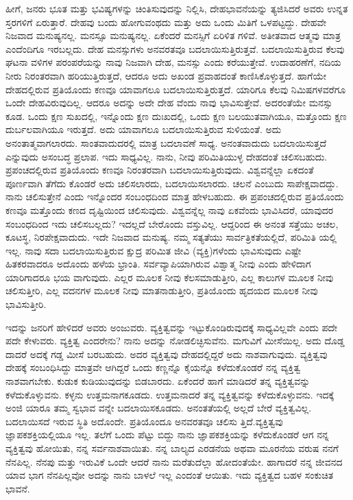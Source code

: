 ಹೀಗೆ, ಜನರು ಭೂತ ಮತ್ತು ಭವಿಷ್ಯಗಳನ್ನು ಚಿಂತಿಸುವುದನ್ನು ನಿಲ್ಲಿಸಿ, ದೇಹಭಾವನೆಯನ್ನು ತ್ಯಜಿಸಿದರೆ ಅವರು ಉನ್ನತ ಸ್ತರಗಳಿಗೆ ಏರುತ್ತಾರೆ. ದೇಹವು ಬಂದು ಹೋಗುವಂಥದು ಮತ್ತು ಅದು ಒಂದು ಮಿತಿಗೆ ಒಳಪಟ್ಟದ್ದು. ದೇಹವೇ ನಿಜವಾದ ಮನುಷ್ಯನಲ್ಲ. ಮನಸ್ಸೂ ಮನುಷ್ಯನಲ್ಲ. ಏಕೆಂದರೆ ಮನಸ್ಸಿಗೆ ಏರಿಳಿತ ಗಳಿವೆ. ಅತೀತವಾದ ಆತ್ಮವು ಮಾತ್ರ ಎಂದೆಂದಿಗೂ ಇರಬಲ್ಲದು. ದೇಹ ಮನಸ್ಸುಗಳು ಅನವರತವೂ ಬದಲಾಯಿಸುತ್ತಿರುತ್ತವೆ. ಬದಲಾಯಿಸುತ್ತಿರುವ ಕೆಲವು ಘಟನಾ ವಳಿಗಳ ಪರಂಪರೆಯನ್ನು ನಾವು ನಿಜವಾಗಿ ದೇಹ, ಮನಸ್ಸು ಎಂದು ಕರೆಯುತ್ತೇವೆ. ಉದಾಹರಣೆಗೆ, ನದಿಯ ನೀರು ನಿರಂತರವಾಗಿ ಹರಿಯುತ್ತಿರುತ್ತದೆ, ಆದರೂ ಅದು ಅಖಂಡ ಪ್ರವಾಹದಂತೆ ಕಾಣಿಸಿಕೊಳ್ಳುತ್ತದೆ. ಹಾಗೆಯೇ ದೇಹದಲ್ಲಿರುವ ಪ್ರತಿಯೊಂದು ಕಣವೂ ಯಾವಾಗಲೂ ಬದಲಾಯಿಸುತ್ತಿರುತ್ತದೆ. ಯಾರಿಗೂ ಕೆಲವು ನಿಮಿಷಗಳವರೆಗೂ ಒಂದೇ ದೇಹವಿರುವುದಿಲ್ಲ. ಆದರೂ ಅದನ್ನು ಅದೇ ದೇಹ ವೆಂದು ನಾವು ಭಾವಿಸುತ್ತೇವೆ. ಅದರಂತೆಯೇ ಮನಸ್ಸು ಕೂಡ. ಒಂದು ಕ್ಷಣ ಸುಖದಲ್ಲಿ, ಇನ್ನೊಂದು ಕ್ಷಣ ದುಃಖದಲ್ಲಿ, ಒಂದು ಕ್ಷಣ ಬಲಯುತವಾಗಿಯೂ, ಮತ್ತೊಂದು ಕ್ಷಣ ದುರ್ಬಲವಾಗಿಯೂ ಇರುತ್ತದೆ. ಅದು ಯಾವಾಗಲೂ ಬದಲಾಯಿಸುತ್ತಿರುವ ಸುಳಿಯಂತೆ. ಅದು ಅನಂತಾತ್ಮವಾಗಲಾರದು. ಸಾಂತವಾದುದರಲ್ಲಿ ಮಾತ್ರ ಬದಲಾವಣೆ ಸಾಧ್ಯ. ಅನಂತವಾದುದು ಬದಲಾಯಿಸುತ್ತದೆ ಎನ್ನುವುದು ಅಸಂಬದ್ಧ ಪ್ರಲಾಪ. ಇದು ಸಾಧ್ಯವಿಲ್ಲ. ನಾನು, ನೀವು ಪರಿಮಿತಿಯುಳ್ಳ ದೇಹದಂತೆ ಚಲಿಸಬಹುದು. ಪ್ರಪಂಚದಲ್ಲಿರುವ ಪ್ರತಿಯೊಂದು ಕಣವೂ ನಿರಂತರವಾಗಿ ಬದಲಾಯಿಸುತ್ತಿರುವುದು. ವಿಶ್ವವನ್ನೆಲ್ಲಾ ಏಕದಂತೆ ಪೂರ್ಣವಾಗಿ ತೆಗೆದು ಕೊಂಡರೆ ಅದು ಚಲಿಸಲಾರದು, ಬದಲಾಯಿಸಲಾರದು. ಚಲನೆ ಎಂಬುದು ಸಾಪೇಕ್ಷವಾದದ್ದು. ನಾನು ಚಲಿಸುತ್ತೇನೆ ಎಂದು ಇನ್ನೊಂದರ ಸಂಬಂಧದಿಂದ ಮಾತ್ರ ಹೇಳಬಹುದು. ಈ ಪ್ರಪಂಚದಲ್ಲಿರುವ ಪ್ರತಿಯೊಂದು ಕಣವೂ ಮತ್ತೊಂದು ಕಣದ ದೃಷ್ಟಿಯಿಂದ ಚಲಿಸುವುದು. ವಿಶ್ವವನ್ನೆಲ್ಲ ನಾವು ಏಕವೆಂದು ಭಾವಿಸಿದರೆ, ಯಾವುದರ ಸಂಬಂಧದಿಂದ ಇದು ಚಲಿಸಬಲ್ಲದು? ಇದಲ್ಲದೆ ಬೇರೊಂದು ವಸ್ತುವಿಲ್ಲ. ಆದ್ದರಿಂದ ಈ ಅನಂತ ಸತ್ತೆಯು ಅಚಲ, ಕೂಟಸ್ಥ, ನಿರಪೇಕ್ಷವಾದುದು. ಇದೇ ನಿಜವಾದ ಮನುಷ್ಯ. ನಮ್ಮ ಸತ್ಯತೆಯು ಸಾರ್ವತ್ರಿಕತೆಯಲ್ಲಿದೆ, ಪರಿಮಿತಿ ಯಲ್ಲಿ ಇಲ್ಲ. ನಾವು ಸದಾ ಬದಲಾಯಿಸುತ್ತಿರುವ ಕ್ಷುದ್ರ ಪರಿಮಿತ ಜೀವಿ (ವ್ಯಕ್ತಿ)ಗಳೆಂದು ಭಾವಿಸುವುದು ಎಷ್ಟೇ ಹಿತಕರವಾದರೂ ಅದೊಂದು ಹಳೆಯ ಭ್ರಾಂತಿ. ಸರ್ವವ್ಯಾಪಿಯಾಗಿರುವ ವಿಶ್ವಾತ್ಮ ನೀವು ಎಂದು ಹೇಳಿದಾಗ ಯಾರಿಗಾದರೂ ಭಯ ವಾಗುವುದು. ಎಲ್ಲರ ಮೂಲಕ ನೀವು ಕೆಲಸಮಾಡುತ್ತೀರಿ, ಎಲ್ಲ ಕಾಲುಗಳ ಮೂಲಕ ನೀವು ಚಲಿಸುತ್ತೀರಿ, ಎಲ್ಲ ವದನಗಳ ಮೂಲಕ ನೀವು ಮಾತನಾಡುತ್ತೀರಿ, ಪ್ರತಿಯೊಂದು ಹೃದಯದ ಮೂಲಕ ನೀವು ಭಾವಿಸುತ್ತೀರಿ.

ಇದನ್ನು ಜನರಿಗೆ ಹೇಳಿದರೆ ಅವರು ಅಂಜುವರು. ವ್ಯಕ್ತಿತ್ವವನ್ನು ಇಟ್ಟುಕೊಂಡಿರುವುದಕ್ಕೆ ಸಾಧ್ಯವಿಲ್ಲವೇ ಎಂದು ಪದೇ ಪದೇ ಕೇಳುವರು. ವ್ಯಕ್ತಿತ್ವ ಎಂದರೇನು? ನಾನು ಅದನ್ನು ನೋಡಲಿಚ್ಛಿಸುವೆನು. ಮಗುವಿಗೆ ಮೀಸೆಯಿಲ್ಲ. ಅದು ದೊಡ್ಡ ದಾದರೆ ಅದಕ್ಕೆ ಗಡ್ಡ ಮೀಸೆ ಬರಬಹುದು. ಅದರ ವ್ಯಕ್ತಿತ್ವವು ದೇಹದಲ್ಲಿದ್ದರೆ ಅದು ನಾಶವಾಗುವುದು. ವ್ಯಕ್ತಿತ್ವವು ದೇಹಕ್ಕೆ ಸಂಬಂಧಿಸಿದ್ದು ಮಾತ್ರವೇ ಆಗಿದ್ದರೆ ಒಂದು ಕಣ್ಣನ್ನೊ ಕೈಯನ್ನೊ ಕಳೆದುಕೊಂಡರೆ ನನ್ನ ವ್ಯಕ್ತಿತ್ವ ನಾಶವಾಗಬೇಕು. ಕುಡುಕ ಕುಡಿಯುವುದನ್ನು ಬಿಡಬಾರದು. ಏಕೆಂದರೆ ಹಾಗೆ ಮಾಡಿದರೆ ತನ್ನ ವ್ಯಕ್ತಿತ್ವವನ್ನು ಕಳೆದುಕೊಳ್ಳುವನು. ಕಳ್ಳನು ಉತ್ತಮನಾಗಕೂಡದು. ಉತ್ತಮನಾದರೆ ತನ್ನ ವ್ಯಕ್ತಿತ್ವವನ್ನು ಕಳೆದುಕೊಳ್ಳುವನು. ಇದಕ್ಕೆ ಅಂಜಿ ಯಾರೂ ತಮ್ಮ ಸ್ವಭಾವ ವನ್ನೇ ಬದಲಾಯಿಸಕೂಡದು. ಅನಂತತೆಯಲ್ಲಿ ಅಲ್ಲದೆ ಬೇರೆ ವ್ಯಕ್ತಿತ್ವವಿಲ್ಲ. ಬದಲಾಯಿಸದೆ ಇರುವ ಸ್ಥಿತಿ ಅದೊಂದೇ. ಪ್ರತಿಯೊಂದೂ ಅನವರತವೂ ಚಲಿಸು ತ್ತಿದೆ.ವ್ಯಕ್ತಿತ್ವವು ಜ್ಞಾಪಕಶಕ್ತಿಯಲ್ಲಿಯೂ ಇಲ್ಲ. ತಲೆಗೆ ಒಂದು ಪೆಟ್ಟು ಬಿದ್ದು ನಾನು ಜ್ಞಾಪಕಶಕ್ತಿಯನ್ನು ಕಳೆದುಕೊಂಡರೆ ಆಗ ನನ್ನ ವ್ಯಕ್ತಿತ್ವವು ಹೋಯಿತು, ನನ್ನ ಸರ್ವನಾಶವಾಯಿತು. ನನ್ನ ಬಾಲ್ಯದ ಎರಡನೆಯ ಅಥವಾ ಮೂರನೆಯ ವರುಷ ನನಗೆ ನೆನಪಿಲ್ಲ. ನೆನಪು ಮತ್ತು ಇರುವಿಕೆ ಒಂದೇ ಆದರೆ ನಾನು ಮರೆತುದೆಲ್ಲಾ ಹೋದಂತೆಯೇ. ಹಾಗಾದರೆ ನನ್ನ ಜೀವನದ ಯಾವ ಭಾಗ ನೆನಪಿಲ್ಲವೋ ಅದನ್ನು ನಾನು ಬಾಳಲೆ ಇಲ್ಲ ಎಂದಂತೆ ಆಯಿತು. ಇದು ವ್ಯಕ್ತಿತ್ವದ ಬಹಳ ಸಂಕುಚಿತ ಭಾವನೆ.

